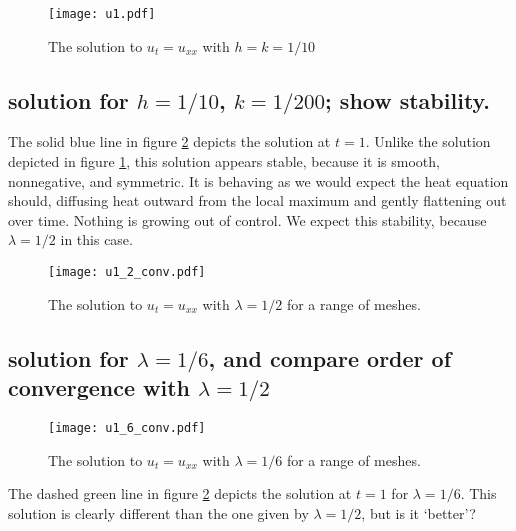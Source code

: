 \documentclass[11pt]{amsart}
\begin{document}
\begin{figure}[t]
\begin{center} 
\texttt{[image: u1.pdf]}
\caption{The solution to $u_t = u_{xx}$ with  $h=k=1/10$ }
\label{u1} 
\end{center}
\end{figure}
  
\subsection{solution for $h=1/10$, $k=1/200$; show stability.}
The solid blue line in figure \ref{u2} depicts the solution at $t=1$. Unlike the solution depicted in figure \ref{u1}, this solution appears stable, because it is smooth, nonnegative, and symmetric. It is behaving as we would expect the heat equation should, diffusing heat outward from the local maximum and gently flattening out over time. Nothing is growing out of control. We expect this stability, because $\lambda = 1/2$ in this case. 

\begin{figure}[t]
\begin{center} 
\texttt{[image: u1\_2\_conv.pdf]}
\caption{The solution to $u_t = u_{xx}$ with $\lambda = 1/2$ for a range of meshes.}
\label{u2} 
\end{center}
\end{figure}

\subsection{solution for $\lambda = 1/6$, and compare order of convergence with $\lambda = 1/2$ } 

\begin{figure}[t]
\begin{center} 
\texttt{[image: u1\_6\_conv.pdf]}
\caption{The solution to $u_t = u_{xx}$ with  $\lambda =1/6$ for a range of meshes.  }
\label{u16} 
\end{center}
\end{figure}

The dashed green line in figure \ref{u2} depicts the solution at $t=1$ for $\lambda =1/6$. This solution is clearly different than the one given by $\lambda =1/2$, but is it `better'? 
\end{document}

